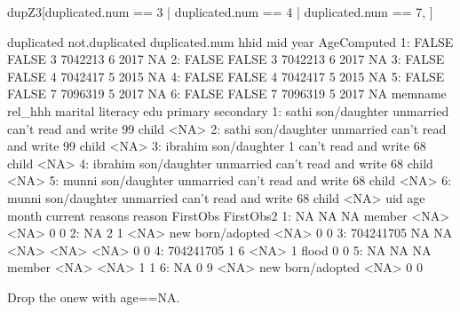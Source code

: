 \begin{Schunk}
\begin{Sinput}
dupZ3[duplicated.num == 3 | duplicated.num == 4 | duplicated.num == 7, ]
\end{Sinput}
\begin{Soutput}
   duplicated not.duplicated duplicated.num    hhid mid year AgeComputed
1:      FALSE          FALSE              3 7042213   6 2017          NA
2:      FALSE          FALSE              3 7042213   6 2017          NA
3:      FALSE          FALSE              4 7042417   5 2015          NA
4:      FALSE          FALSE              4 7042417   5 2015          NA
5:      FALSE          FALSE              7 7096319   5 2017          NA
6:      FALSE          FALSE              7 7096319   5 2017          NA
   memname      rel_hhh   marital             literacy edu primary secondary
1:   sathi son/daughter unmarried can't read and write  99   child      <NA>
2:   sathi son/daughter unmarried can't read and write  99   child      <NA>
3: ibrahim son/daughter         1 can't read and write  68   child      <NA>
4: ibrahim son/daughter unmarried can't read and write  68   child      <NA>
5:   munni son/daughter unmarried can't read and write  68   child      <NA>
6:   munni son/daughter unmarried can't read and write  68   child      <NA>
         uid age month current          reasons reason FirstObs FirstObs2
1:        NA  NA    NA  member             <NA>   <NA>        0         0
2:        NA   2     1    <NA> new born/adopted   <NA>        0         0
3: 704241705  NA    NA    <NA>             <NA>   <NA>        0         0
4: 704241705   1     6    <NA>                1  flood        0         0
5:        NA  NA    NA  member             <NA>   <NA>        1         1
6:        NA   0     9    <NA> new born/adopted   <NA>        0         0
\end{Soutput}
\end{Schunk}
Drop the onew with \textsf{age}==NA.
